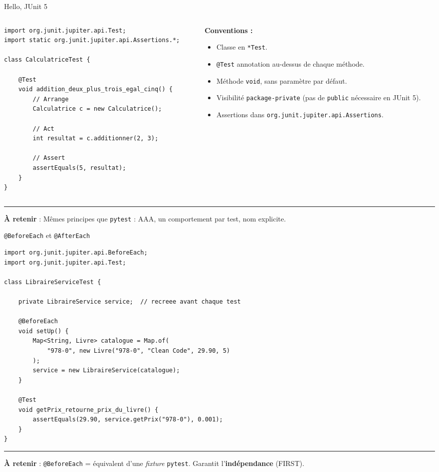 \documentclass[aspectratio=169,11pt]{beamer}
\newcommand{\takeaway}[1]{%
\vfill\begin{beamercolorbox}[wd=\linewidth,sep=0.4em]{}
\color{accent2}\rule[0.6ex]{1.2em}{1.2pt}\hspace{0.4em}%
\textbf{\color{accent2}\small À retenir} \textcolor{textsoft}{:} %
{\small\color{textmain}#1}
\end{beamercolorbox}}
\begin{document}
\begin{frame}[fragile,t,shrink=25]{Hello, JUnit 5}
\begin{columns}[T,onlytextwidth]
\begin{column}{0.55\textwidth}
\begin{lstlisting}[style=javadark]
import org.junit.jupiter.api.Test;
import static org.junit.jupiter.api.Assertions.*;

class CalculatriceTest {

    @Test
    void addition_deux_plus_trois_egal_cinq() {
        // Arrange
        Calculatrice c = new Calculatrice();

        // Act
        int resultat = c.additionner(2, 3);

        // Assert
        assertEquals(5, resultat);
    }
}
\end{lstlisting}
\end{column}
\begin{column}{0.42\textwidth}
\vspace{0.2cm}\footnotesize
\textbf{Conventions :}\\[0.2em]
\begin{itemize}\scriptsize
\item Classe en \texttt{*Test}.
\item \texttt{@Test} annotation au-dessus de chaque méthode.
\item Méthode \texttt{void}, sans paramètre par défaut.
\item Visibilité \texttt{package-private} (pas de \texttt{public} nécessaire en JUnit 5).
\item Assertions dans \texttt{org.junit.jupiter.api.Assertions}.
\end{itemize}
\end{column}
\end{columns}
\takeaway{Mêmes principes que \texttt{pytest} : AAA, un comportement par test, nom explicite.}
\end{frame}

\begin{frame}[fragile,t,shrink=20]{\texttt{@BeforeEach} et \texttt{@AfterEach}}
\begin{lstlisting}[style=javadark]
import org.junit.jupiter.api.BeforeEach;
import org.junit.jupiter.api.Test;

class LibraireServiceTest {

    private LibraireService service;  // recreee avant chaque test

    @BeforeEach
    void setUp() {
        Map<String, Livre> catalogue = Map.of(
            "978-0", new Livre("978-0", "Clean Code", 29.90, 5)
        );
        service = new LibraireService(catalogue);
    }

    @Test
    void getPrix_retourne_prix_du_livre() {
        assertEquals(29.90, service.getPrix("978-0"), 0.001);
    }
}
\end{lstlisting}
\takeaway{\texttt{@BeforeEach} = équivalent d'une \emph{fixture} \texttt{pytest}. Garantit l'\textbf{indépendance} (FIRST).}
\end{frame}
\end{document}
